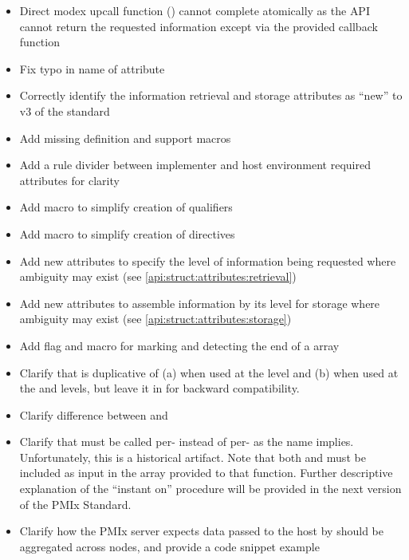\begin{itemize}
    \item Direct modex upcall function () cannot complete atomically as the \ac{API} cannot return the requested information except via the provided callback function
    \item Fix typo in name of  attribute
    \item Correctly identify the information retrieval and storage attributes as ``new'' to v3 of the standard
    \item Add missing  definition and support macros
    \item Add a rule divider between implementer and host environment required attributes for clarity
    \item Add  macro to simplify creation of  qualifiers
    \item Add  macro to simplify creation of  directives
    \item Add new attributes to specify the level of information being requested where ambiguity may exist (see \ref{api:struct:attributes:retrieval})
    \item Add new attributes to assemble information by its level for storage where ambiguity may exist (see \ref{api:struct:attributes:storage})
    \item Add flag and  macro for marking and detecting the end of a  array
    \item Clarify that  is duplicative of (a)  when used at the  level and (b)  when used at the  and  levels, but leave it in for backward compatibility.
    \item Clarify difference between  and 
    \item Clarify that  must be called per- instead of per- as the name implies. Unfortunately, this is a historical artifact. Note that both  and  must be included as input in the  array provided to that function. Further descriptive explanation of the ``instant on'' procedure will be provided in the next version of the \ac{PMIx} Standard.
    \item Clarify how the \ac{PMIx} server expects data passed to the host by  should be aggregated across nodes, and provide a code snippet example
\end{itemize}



